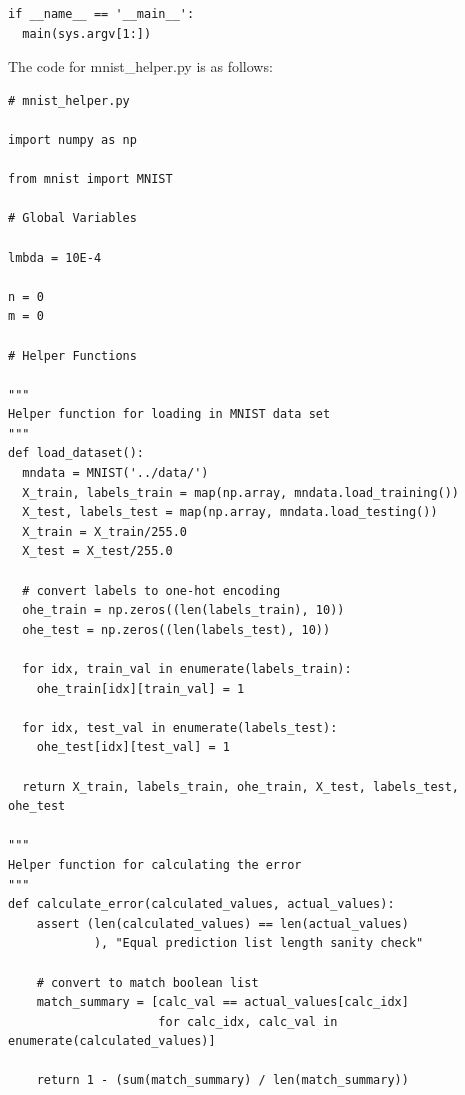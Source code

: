 \documentclass{article}
\newcommand{\1}{\mathbf{1}}
\begin{document}
{\begin{verbatim}
if __name__ == '__main__':
  main(sys.argv[1:])

\end{verbatim}
The code for mnist\_helper.py is as follows: \\ 

\begin{verbatim}
# mnist_helper.py

import numpy as np

from mnist import MNIST

# Global Variables

lmbda = 10E-4

n = 0
m = 0

# Helper Functions

"""
Helper function for loading in MNIST data set
"""
def load_dataset():
  mndata = MNIST('../data/')
  X_train, labels_train = map(np.array, mndata.load_training())
  X_test, labels_test = map(np.array, mndata.load_testing())
  X_train = X_train/255.0
  X_test = X_test/255.0

  # convert labels to one-hot encoding
  ohe_train = np.zeros((len(labels_train), 10))
  ohe_test = np.zeros((len(labels_test), 10))

  for idx, train_val in enumerate(labels_train):
    ohe_train[idx][train_val] = 1

  for idx, test_val in enumerate(labels_test):
    ohe_test[idx][test_val] = 1

  return X_train, labels_train, ohe_train, X_test, labels_test, ohe_test

"""
Helper function for calculating the error
"""
def calculate_error(calculated_values, actual_values):
    assert (len(calculated_values) == len(actual_values)
            ), "Equal prediction list length sanity check"
    
    # convert to match boolean list
    match_summary = [calc_val == actual_values[calc_idx]
                     for calc_idx, calc_val in enumerate(calculated_values)]

    return 1 - (sum(match_summary) / len(match_summary))


\end{verbatim}

}
\end{document}
